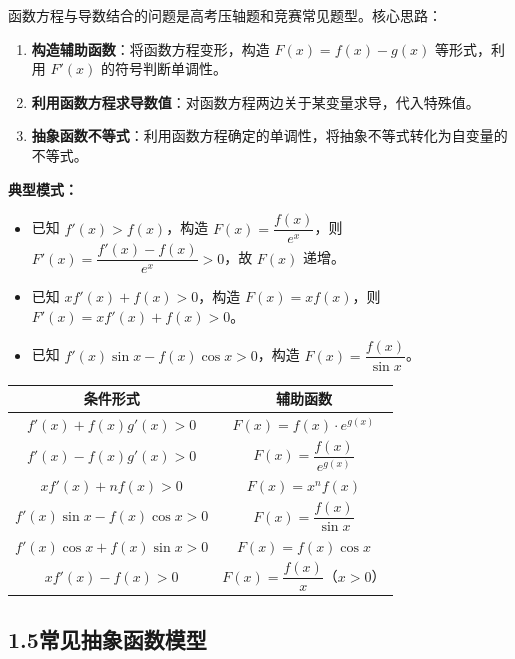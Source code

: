 \documentclass[12pt,a4paper]{ctexart}
\begin{document}
\begin{knowledgebox}[导数与函数方程]
函数方程与导数结合的问题是高考压轴题和竞赛常见题型。核心思路：
\begin{enumerate}[label=(\arabic*)]
  \item \textbf{构造辅助函数}：将函数方程变形，构造 $F(x)=f(x)-g(x)$ 等形式，利用 $F'(x)$ 的符号判断单调性。
  \item \textbf{利用函数方程求导数值}：对函数方程两边关于某变量求导，代入特殊值。
  \item \textbf{抽象函数不等式}：利用函数方程确定的单调性，将抽象不等式转化为自变量的不等式。
\end{enumerate}

\medskip
\textbf{典型模式：}
\begin{itemize}
  \item 已知 $f'(x)>f(x)$，构造 $F(x)=\dfrac{f(x)}{e^x}$，则 $F'(x)=\dfrac{f'(x)-f(x)}{e^x}>0$，故 $F(x)$ 递增。
  \item 已知 $xf'(x)+f(x)>0$，构造 $F(x)=xf(x)$，则 $F'(x)=xf'(x)+f(x)>0$。
  \item 已知 $f'(x)\sin x-f(x)\cos x>0$，构造 $F(x)=\dfrac{f(x)}{\sin x}$。
\end{itemize}
\end{knowledgebox}

\begin{tipbox}[构造辅助函数的常用技巧]
\begin{center}
\renewcommand{\arraystretch}{1.4}
\begin{tabular}{|c|c|}
\hline
\textbf{条件形式} & \textbf{辅助函数} \\
\hline
$f'(x)+f(x)g'(x)>0$ & $F(x)=f(x)\cdot e^{g(x)}$ \\
\hline
$f'(x)-f(x)g'(x)>0$ & $F(x)=\dfrac{f(x)}{e^{g(x)}}$ \\
\hline
$xf'(x)+nf(x)>0$ & $F(x)=x^nf(x)$ \\
\hline
$f'(x)\sin x-f(x)\cos x>0$ & $F(x)=\dfrac{f(x)}{\sin x}$ \\
\hline
$f'(x)\cos x+f(x)\sin x>0$ & $F(x)=f(x)\cos x$ \\
\hline
$xf'(x)-f(x)>0$ & $F(x)=\dfrac{f(x)}{x}$（$x>0$） \\
\hline
\end{tabular}
\end{center}
\end{tipbox}

\subsection*{1.5\quad 常见抽象函数模型}
\end{document}
